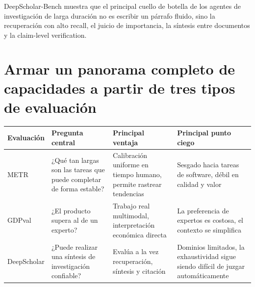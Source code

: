 \documentclass[a4paper]{article}
\begin{document}
DeepScholar-Bench muestra que el principal cuello de botella de los agentes de investigación de larga duración no es escribir un párrafo fluido, sino la recuperación con alto recall, el juicio de importancia, la síntesis entre documentos y la claim-level verification.
\section{Armar un panorama completo de capacidades a partir de tres tipos de evaluación}



\begin{table}[H]
\centering
\small
\begin{tabular}{>{\raggedright\arraybackslash}p{2.6cm}>{\raggedright\arraybackslash}p{3.4cm}>{\raggedright\arraybackslash}p{3.8cm}>{\raggedright\arraybackslash}p{3.5cm}}
\toprule
\textbf{Evaluación} & \textbf{Pregunta central} & \textbf{Principal ventaja} & \textbf{Principal punto ciego} \\
\midrule
METR & ¿Qué tan largas son las tareas que puede completar de forma estable? & Calibración uniforme en tiempo humano, permite rastrear tendencias & Sesgado hacia tareas de software, débil en calidad y valor \\
GDPval & ¿El producto supera al de un experto? & Trabajo real multimodal, interpretación económica directa & La preferencia de expertos es costosa, el contexto se simplifica \\
DeepScholar & ¿Puede realizar una síntesis de investigación confiable? & Evalúa a la vez recuperación, síntesis y citación & Dominios limitados, la exhaustividad sigue siendo difícil de juzgar automáticamente \\
\bottomrule
\end{tabular}
\end{table}

\end{document}

